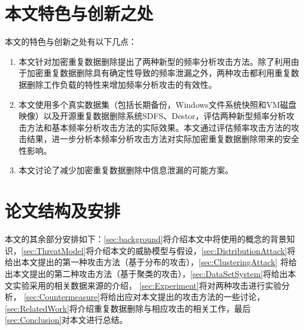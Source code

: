\section{本文特色与创新之处}

本文的特色与创新之处有以下几点：

\begin{enumerate}
    \item 本文针对加密重复数据删除提出了两种新型的频率分析攻击方法。除了利用由于加密重复数据删除具有确定性导致的频率泄漏之外，两种攻击都利用重复数据删除工作负载的特性来增加频率分析攻击的有效性。
    \item 本文使用多个真实数据集（包括长期备份，Windows文件系统快照和VM磁盘映像）以及开源重复数据删除系统SDFS、Destor，评估两种新型频率分析攻击方法和基本频率分析攻击方法的实际效果。本文通过评估频率攻击方法的攻击结果，进一步分析本频率分析攻击方法对实际加密重复数据删除带来的安全性影响。
    \item 本文讨论了减少加密重复数据删除中信息泄漏的可能方案。
\end{enumerate}

\section{论文结构及安排}

本文的其余部分安排如下：\ref{sec:background}将介绍本文中将使用的概念的背景知识，\ref{sec:ThreatModel}将介绍本文的威胁模型与假设，\ref{sec:DistributionAttack}将给出本文提出的第一种攻击方法（基于分布的攻击），\ref{sec:ClusteringAttack} 将给出本文提出的第二种攻击方法（基于聚类的攻击），\ref{sec:DataSetSystem}将给出本文实验采用的相关数据来源的介绍， \ref{sec:Experiment}将对两种攻击进行实验分析， \ref{sec:Countermeasure}将给出应对本文提出的攻击方法的一些讨论， \ref{sec:RelatedWork}将介绍重复数据删除与相应攻击的相关工作，最后\ref{sec:Conclusion}对本文进行总结。


